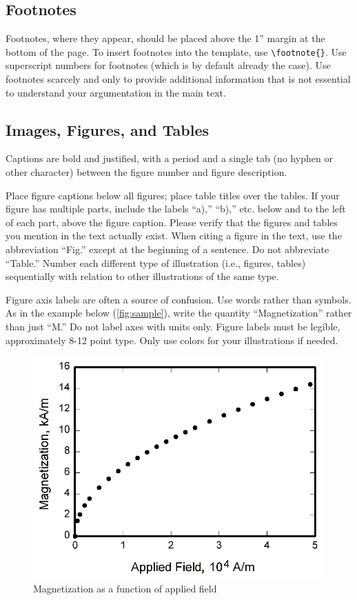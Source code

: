 \subsection{Footnotes}
Footnotes, where they appear, should be placed above the 1” margin at the bottom of the page. To insert footnotes into the template, use \verb+\footnote{}+. Use superscript numbers for footnotes (which is by default already the case). Use footnotes scarcely and only to provide additional information that is not essential to understand your argumentation in the main text. 

\subsection{Images, Figures, and Tables}
Captions are bold and justified, with a period and a single tab (no hyphen or other character) between the figure number and figure description.

Place figure captions below all figures; place table titles over the tables. If your figure has multiple parts, include the labels “a),” “b),” etc. below and to the left of each part, above the figure caption. Please verify that the figures and tables you mention in the text actually exist. When citing a figure in the text, use the abbreviation “Fig.” except at the beginning of a sentence. Do not abbreviate “Table.” Number each different type of illustration (i.e., figures, tables) sequentially with relation to other illustrations of the same type.

Figure axis labels are often a source of confusion. Use words rather than symbols. As in the example below (\autoref{fig:sample}), write the quantity “Magnetization” rather than just “M.” Do not label axes with units only. 
Figure labels must be legible, approximately 8-12 point type. Only use colors for your illustrations if needed. 

\begin{figure}[h]
    \centering
    \includegraphics[width=0.4\linewidth]{figures/graph.jpg}
    \caption{Magnetization as a function of applied field}
    \label{fig:sample}
\end{figure}

